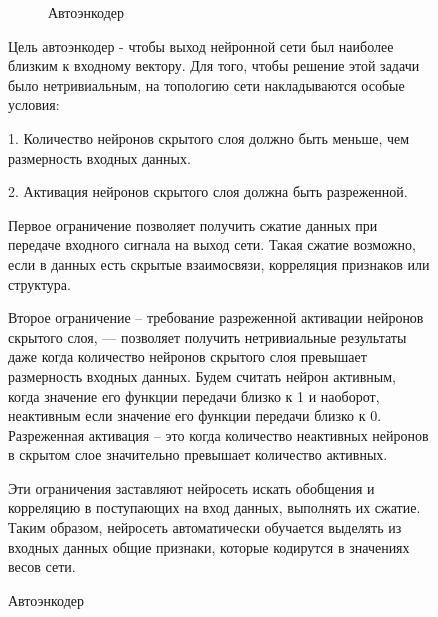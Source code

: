 \documentclass[12pt]{article}
\begin{document}
\begin{figure}[h]
  \begin{figure}[H]
    \noindent{}
    \caption{Автоэнкодер}
    \label{figCurves}
  \end{figure}

Цель автоэнкодер - чтобы выход нейронной сети был наиболее близким к входному вектору. Для того, чтобы решение этой задачи было нетривиальным, на топологию сети накладываются особые условия:

1. Количество нейронов скрытого слоя должно быть меньше, чем размерность входных данных.

2. Активация нейронов скрытого слоя должна быть разреженной.

Первое ограничение позволяет получить сжатие данных при передаче входного сигнала на выход сети. Такая сжатие возможно, если в данных есть скрытые взаимосвязи, корреляция признаков или структура.

Второе ограничение – требование разреженной активации нейронов скрытого слоя, — позволяет получить нетривиальные результаты даже когда количество нейронов скрытого слоя превышает размерность входных данных. Будем считать нейрон активным, когда значение его функции передачи близко к 1 и наоборот, неактивным если значение его функции передачи близко к 0. Разреженная активация – это когда количество неактивных нейронов в скрытом слое значительно превышает количество активных.

Эти ограничения заставляют нейросеть искать обобщения и корреляцию в поступающих на вход данных, выполнять их сжатие. Таким образом, нейросеть автоматически обучается выделять из входных данных общие признаки, которые кодирутся в значениях весов сети.


\end{figure}
\end{document}
